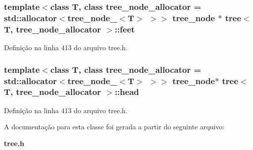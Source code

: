 \subsubsection[{feet}]{\setlength{\rightskip}{0pt plus 5cm}template$<$class T, class tree\+\_\+node\+\_\+allocator = std\+::allocator$<$tree\+\_\+node\+\_\+$<$\+T$>$ $>$$>$ {\bf tree\+\_\+node} $\ast$ {\bf tree}$<$ T, tree\+\_\+node\+\_\+allocator $>$\+::feet}\label{classtree_ae1dbb80115ba483e37d081a2256c239b}


Definição na linha 413 do arquivo tree.\+h.

\subsubsection[{head}]{\setlength{\rightskip}{0pt plus 5cm}template$<$class T, class tree\+\_\+node\+\_\+allocator = std\+::allocator$<$tree\+\_\+node\+\_\+$<$\+T$>$ $>$$>$ {\bf tree\+\_\+node}$\ast$ {\bf tree}$<$ T, tree\+\_\+node\+\_\+allocator $>$\+::head}\label{classtree_a10991cbf1497e125c0ef04d6e292e32b}


Definição na linha 413 do arquivo tree.\+h.



A documentação para esta classe foi gerada a partir do seguinte arquivo\+:\begin{DoxyCompactItemize}
\item 
{\bf tree.\+h}\end{DoxyCompactItemize}
